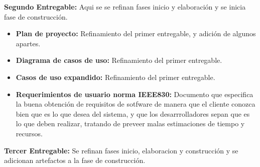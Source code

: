                 \textbf{Segundo Entregable:} Aqui se se refinan fases inicio y elaboración y se
                inicia fase de construcción.
                
                \begin{itemize}
                \item\textbf{Plan de proyecto:} Refinamiento del primer entregable, y adición de
                algunos apartes.
                \item\textbf{Diagrama de casos de uso:} Refinamiento del primer entregable.
                \item\textbf{Casos de uso expandido:} Refinamiento del primer entregable.
                \item\textbf{Requerimientos de usuario norma IEEE830:} Documento que especifica la
                buena obtención de requisitos de sotfware de manera que el cliente conozca bien que
                es lo que desea del sistema, y que los desarrrolladores sepan que es lo que deben
                realizar, tratando de preveer malas estimaciones de tiempo y recursos.
                \end{itemize}
                
                \textbf{Tercer Entregable:} Se refinan fases inicio, elaboracion y construcción y
                se adicionan artefactos a la fase de construcción.
                
